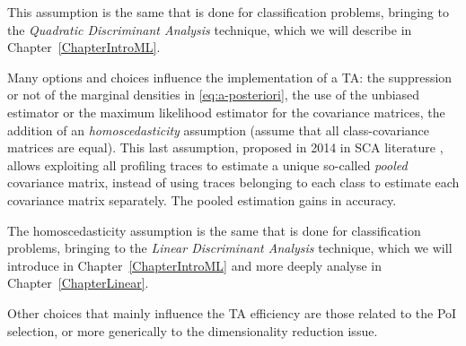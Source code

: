 \begin{remark}This assumption is the same that is done for classification problems, bringing to the \emph{Quadratic Discriminant Analysis} technique, which we will describe in Chapter~\ref{ChapterIntroML}. 
\end{remark}

Many options and choices influence the implementation of a TA: the suppression or not of the marginal densities in \eqref{eq:a-posteriori}, the use of the unbiased estimator or the maximum likelihood estimator for the covariance matrices, the addition of an \emph{homoscedasticity} assumption (assume that all class-covariance matrices are equal). This last assumption, proposed in 2014 in SCA literature \cite{choudary2014efficient},  allows exploiting all profiling traces to estimate a unique so-called \emph{pooled} covariance matrix, instead of using traces belonging to each class to estimate each covariance matrix separately. The pooled estimation gains in accuracy. 

\begin{remark}
The homoscedasticity assumption is the same that is done for classification problems, bringing to the \emph{Linear Discriminant Analysis} technique, which we will introduce in Chapter~\ref{ChapterIntroML} and more deeply analyse in Chapter~\ref{ChapterLinear}.  
\end{remark}

Other choices that mainly influence the TA efficiency are those related to the PoI selection, or more generically to the dimensionality reduction issue.


